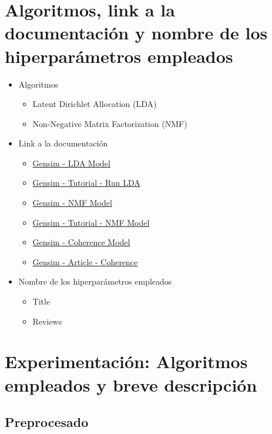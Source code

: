 \documentclass{report}
\begin{document}
        \section{Algoritmos, link a la documentación y nombre de los hiperparámetros empleados}
            \begin{itemize}
                \item Algoritmos
                \begin{itemize}
                    \item Latent Dirichlet Allocation (LDA)
                    \item Non-Negative Matrix Factorization (NMF)
                \end{itemize}
                \item Link a la documentación
                \begin{itemize}
                    \item \href{https://radimrehurek.com/gensim/models/ldamodel.html}{Gensim - LDA Model}
                    \item \href{https://radimrehurek.com/gensim/auto_examples/tutorials/run_lda.html}{Gensim - Tutorial - Run LDA}
                    \item \href{https://radimrehurek.com/gensim/models/nmf.html}{Gensim - NMF Model}
                    \item \href{https://radimrehurek.com/gensim_3.8.3/models/nmf.html}{Gensim - Tutorial - NMF Model}
                    \item \href{https://radimrehurek.com/gensim/models/coherencemodel.html}{Gensim - Coherence Model}
                    \item \href{https://gensimr.news-r.org/articles/coherence}{Gensim - Article - Coherence}
                \end{itemize}
                \item Nombre de los hiperparámetros empleados
                \begin{itemize}
                    \item Title
                    \item Reviews
                \end{itemize}
            \end{itemize}
        \clearpage\section{Experimentación: Algoritmos empleados y breve descripción}
            \subsection{Preprocesado}
\end{document}
